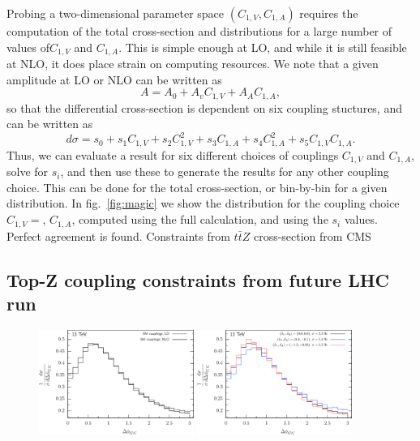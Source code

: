 \documentclass[preprint]{JHEP3} %
\begin{document}
Probing a two-dimensional parameter space $(C_{1,V},C_{1,A})$ requires the computation of the total cross-section and distributions for a large number of values of$C_{1,V}$ and $C_{1,A}$. This is simple enough at LO, and while it is still feasible at NLO, it does place strain on computing resources. We note that a given amplitude at LO or NLO can be written as
\begin{equation}
A = A_0 + A_v C_{1,V} + A_A C_{1,A},
\end{equation}
so that the differential cross-section is dependent on six coupling stuctures, and can be written as
\begin{equation}
d\sigma = s_0 +s_1C_{1,V} + s_2C_{1,V}^2 +s_3 C_{1,A}+s_4C_{1,A}^2+s_5C_{1,V}C_{1,A}.
\end{equation}
Thus, we can evaluate a result for six different choices of couplings $C_{1,V}$ and $C_{1,A}$, solve for $s_i$, and then use these to generate the results for any other coupling choice. This can be done for the total cross-section, or bin-by-bin for a given distribution. In fig.~\ref{fig:magic} we show the distribution for the coupling choice $C_{1,V}=$, $C_{1,A}$, computed using the full calculation, and using the $s_i$ values. Perfect agreement is found. 
Constraints from $t\bar{t}Z$ cross-section from CMS \\

\subsection{Top-Z coupling constraints from future LHC run}



\begin{figure}[t]
\centering %
\includegraphics[width=0.45\textwidth]{./LHC_53_Fig17a.eps}
\hfill
\includegraphics[width=0.45\textwidth]{./LHC_53_Fig17b.eps}
\caption{\label{fig:iii} }
\end{figure}
\end{document}
